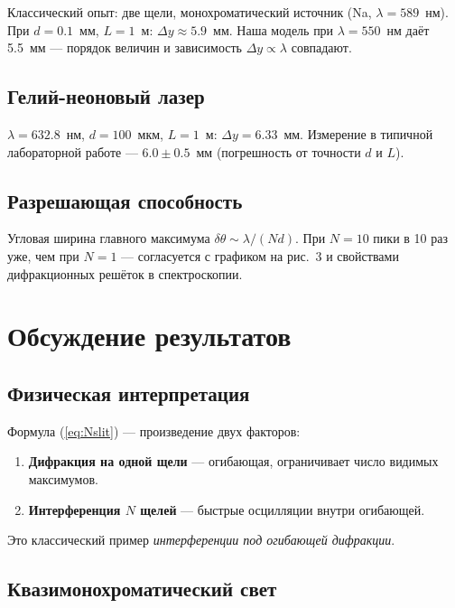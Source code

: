 \documentclass[12pt,a4paper]{article}
\begin{document}
Классический опыт: две щели, монохроматический источник (Na, \(\lambda=589\)~нм).
При \(d=0.1\)~мм, \(L=1\)~м: \(\Delta y\approx5.9\)~мм. Наша модель при
\(\lambda=550\)~нм даёт 5.5~мм --- порядок величин и зависимость
\(\Delta y\propto\lambda\) совпадают.

\subsection{Гелий-неоновый лазер}

\(\lambda=632.8\)~нм, \(d=100\)~мкм, \(L=1\)~м:
\(\Delta y=6.33\)~мм. Измерение в типичной лабораторной работе ---
\(6.0\pm0.5\)~мм (погрешность от точности \(d\) и \(L\)).

\subsection{Разрешающая способность}

Угловая ширина главного максимума \(\delta\theta\sim\lambda/(Nd)\). При \(N=10\)
пики в 10 раз уже, чем при \(N=1\) --- согласуется с графиком на
рис.~3 и свойствами дифракционных решёток в спектроскопии.

\section{Обсуждение результатов}

\subsection{Физическая интерпретация}

Формула (\ref{eq:Nslit}) --- произведение двух факторов:
\begin{enumerate}
  \item \textbf{Дифракция на одной щели} --- огибающая, ограничивает число
        видимых максимумов.
  \item \textbf{Интерференция \(N\) щелей} --- быстрые осцилляции внутри огибающей.
\end{enumerate}
Это классический пример \emph{интерференции под огибающей дифракции}.

\subsection{Квазимонохроматический свет}
\end{document}
